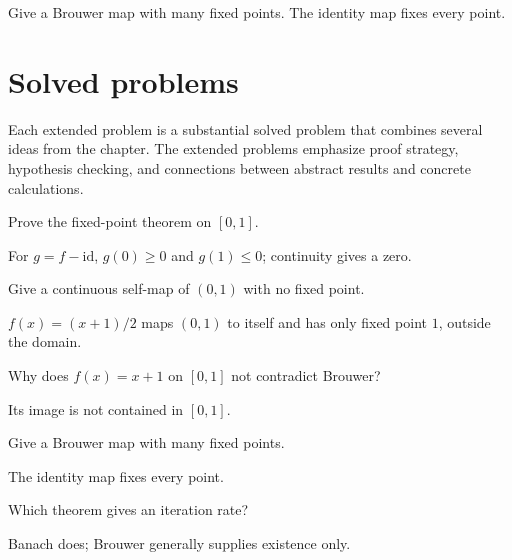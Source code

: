 \begin{example}[Nonuniqueness]\label{ex:ii17-worked-04}
Give a Brouwer map with many fixed points. The identity map fixes every point.
\end{example}

\section{Solved problems}
Each extended problem is a substantial solved problem that combines several ideas from the chapter. The extended problems emphasize proof strategy, hypothesis checking, and connections between abstract results and concrete calculations.

\begin{problem}\label{prob:ii17-problem-01}
Prove the fixed-point theorem on $[0,1]$.
\end{problem}
\begin{solution}
For $g=f-\mathrm{id}$, $g(0)\ge0$ and $g(1)\le0$; continuity gives a zero.
\end{solution}

\begin{problem}\label{prob:ii17-problem-02}
Give a continuous self-map of $(0,1)$ with no fixed point.
\end{problem}
\begin{solution}
$f(x)=(x+1)/2$ maps $(0,1)$ to itself and has only fixed point $1$, outside the domain.
\end{solution}

\begin{problem}\label{prob:ii17-problem-03}
Why does $f(x)=x+1$ on $[0,1]$ not contradict Brouwer?
\end{problem}
\begin{solution}
Its image is not contained in $[0,1]$.
\end{solution}

\begin{problem}[Nonuniqueness]\label{prob:ii17-problem-04}
Give a Brouwer map with many fixed points.
\end{problem}
\begin{solution}
The identity map fixes every point.
\end{solution}

\begin{problem}\label{prob:ii17-problem-05}
Which theorem gives an iteration rate?
\end{problem}
\begin{solution}
Banach does; Brouwer generally supplies existence only.
\end{solution}

